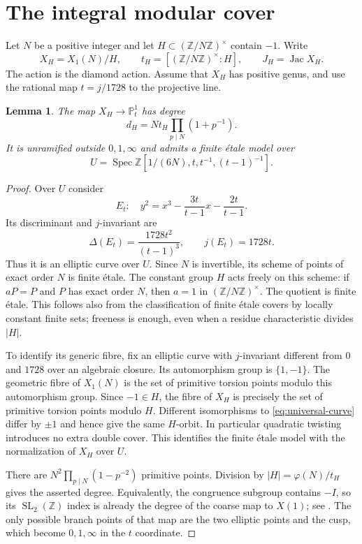 \documentclass[11pt,a4paper]{article}
\newtheorem{lemma}[theorem]{Lemma}
\theoremstyle{definition}
\newcommand{\Z}{\mathbb Z}
\newcommand{\Jac}{\operatorname{Jac}}
\begin{document}
\section{The integral modular cover}

Let $N$ be a positive integer and let
$H\subset(\Z/N\Z)^\times$ contain $-1$. Write
\[
 X_H=X_1(N)/H,\qquad t_H=[(\Z/N\Z)^\times:H],
 \qquad J_H=\Jac X_H.
\]
The action is the diamond action. Assume that $X_H$ has positive
genus, and use the rational map $t=j/1728$ to the projective line.

\begin{lemma}\label{lem:modular-model}
The map $X_H\to\mathbb P^1_t$ has degree
\[
 d_H=Nt_H\prod_{p\mid N}(1+p^{-1}).
\]
It is unramified outside $0,1,\infty$ and admits a finite \'etale
model over
\[
 U=\operatorname{Spec}\Z[1/(6N),t,t^{-1},(t-1)^{-1}].
\]
\end{lemma}
\begin{proof}
Over $U$ consider
\begin{equation}\label{eq:universal-curve}
 E_t:\quad y^2=x^3-\frac{3t}{t-1}x-\frac{2t}{t-1}.
\end{equation}
Its discriminant and $j$-invariant are
\[
 \Delta(E_t)=\frac{1728t^2}{(t-1)^3},\qquad j(E_t)=1728t.
\]
Thus it is an elliptic curve over $U$. Since $N$ is invertible,
its scheme of points of exact order $N$ is finite \'etale.
The constant group $H$ acts freely on this scheme: if $aP=P$
and $P$ has exact order $N$, then $a=1$ in $(\Z/N\Z)^\times$.
The quotient is finite \'etale. This follows also from the
classification of finite \'etale covers by locally constant finite
sets; freeness is enough, even when a residue characteristic divides
$|H|$.

To identify its generic fibre, fix an elliptic curve with
$j$-invariant different from $0$ and $1728$ over an algebraic
closure. Its automorphism group is $\{1,-1\}$. The geometric
fibre of $X_1(N)$ is the set of primitive torsion points modulo
this automorphism group. Since $-1\in H$, the fibre of $X_H$
is precisely the set of primitive torsion points modulo $H$.
Different isomorphisms to \eqref{eq:universal-curve} differ by
$\pm1$ and hence give the same $H$-orbit. In particular quadratic
twisting introduces no extra double cover. This identifies the
finite \'etale model with the normalization of $X_H$ over $U$.

There are $N^2\prod_{p\mid N}(1-p^{-2})$ primitive points.
Division by $|H|=\varphi(N)/t_H$ gives the asserted degree.
Equivalently, the congruence subgroup contains $-I$, so its
$\operatorname{SL}_2(\Z)$ index is already the degree of the
coarse map to $X(1)$; see \cite[Section~4]{vonKaenel}.
The only possible branch points of that map are the two elliptic
points and the cusp, which become $0,1,\infty$ in the $t$ coordinate.
\end{proof}
\end{document}
